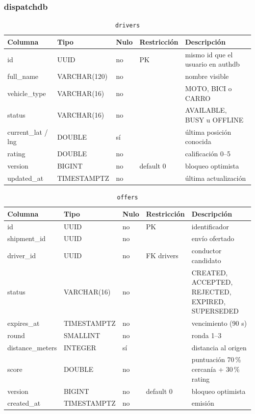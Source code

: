 \documentclass[conference]{IEEEtran}
\newcommand{\pkg}[1]{\texttt{#1}}
\begin{document}
\subsubsection{dispatchdb}

\begin{table}[!t]
\centering
\caption{\pkg{drivers}}

\begin{tabular}{@{}L{3.2cm}L{3.2cm}L{1.1cm}L{3.4cm}L{3.9cm}@{}}
\toprule
\textbf{Columna} & \textbf{Tipo} & \textbf{Nulo} & \textbf{Restricción} & \textbf{Descripción}\\
\midrule
id & UUID & no & PK & mismo id que el usuario en authdb\\
full\_name & VARCHAR(120) & no & & nombre visible\\
vehicle\_type & VARCHAR(16) & no & & MOTO, BICI o CARRO\\
status & VARCHAR(16) & no & & AVAILABLE, BUSY u OFFLINE\\
current\_lat / lng & DOUBLE & sí & & última posición conocida\\
rating & DOUBLE & no & & calificación 0–5\\
version & BIGINT & no & default 0 & bloqueo optimista\\
updated\_at & TIMESTAMPTZ & no & & última actualización\\
\bottomrule
\end{tabular}
\end{table}

\begin{table}[!t]
\centering
\caption{\pkg{offers}}

\begin{tabular}{@{}L{3.2cm}L{3.2cm}L{1.1cm}L{3.4cm}L{3.9cm}@{}}
\toprule
\textbf{Columna} & \textbf{Tipo} & \textbf{Nulo} & \textbf{Restricción} & \textbf{Descripción}\\
\midrule
id & UUID & no & PK & identificador\\
shipment\_id & UUID & no & & envío ofertado\\
driver\_id & UUID & no & FK drivers & conductor candidato\\
status & VARCHAR(16) & no & & CREATED, ACCEPTED, REJECTED, EXPIRED, SUPERSEDED\\
expires\_at & TIMESTAMPTZ & no & & vencimiento (90 s)\\
round & SMALLINT & no & & ronda 1–3\\
distance\_meters & INTEGER & sí & & distancia al origen\\
score & DOUBLE & no & & puntuación 70\,\% cercanía + 30\,\% rating\\
version & BIGINT & no & default 0 & bloqueo optimista\\
created\_at & TIMESTAMPTZ & no & & emisión\\
\bottomrule
\end{tabular}
\end{table}
\end{document}
